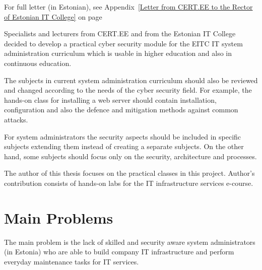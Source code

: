 For full letter (in Estonian), see Appendix~\ref{Letter from CERT.EE to the Rector of Estonian IT College} on page ~\pageref{Letter from CERT.EE to the Rector of Estonian IT College}

Specialists and lecturers from \gls{CERT.EE} and from the Estonian IT College decided to develop a practical cyber security module for the \gls{EITC} IT system administration curriculum which is usable in higher education and also in continuous education.

The subjects in current system administration curriculum should also be reviewed and changed according to the needs of the cyber security field. For example, the hands-on class for installing a web server should contain installation, configuration and also the defence and mitigation methods against common attacks. 

For system administrators the security aspects should be included in specific subjects extending them instead of creating a separate subjects. On the other hand, some subjects should focus only on the security, architecture and processes.

The author of this thesis focuses on the practical classes in this project. Author's contribution consists of hands-on labs for the IT infrastructure services e-course.

\section{Main Problems}
The main problem is the lack of skilled and security aware system administrators (in Estonia) who are able to build company IT infrastructure and perform everyday maintenance tasks for IT services.

